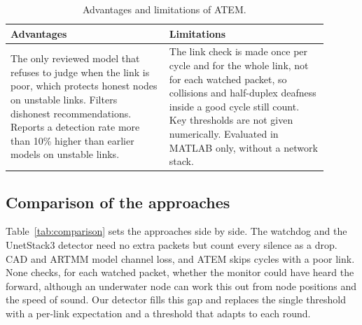 \documentclass{article}
\begin{document}
\begin{table}[htbp]
\centering\footnotesize\renewcommand{\arraystretch}{1.1}
\begin{tabular}{|p{0.45\linewidth}|p{0.45\linewidth}|}
\hline
\textbf{Advantages} & \textbf{Limitations} \\
\hline
The only reviewed model that refuses to judge when the link is poor, which protects honest nodes on unstable links. Filters dishonest recommendations. Reports a detection rate more than 10\% higher than earlier models on unstable links. & The link check is made once per cycle and for the whole link, not for each watched packet, so collisions and half-duplex deafness inside a good cycle still count. Key thresholds are not given numerically. Evaluated in MATLAB only, without a network stack. \\
\hline
\end{tabular}
\caption{Advantages and limitations of ATEM.}
\end{table}

\subsection{Comparison of the approaches}\label{sec:comparison}
\noindent
Table~\ref{tab:comparison} sets the approaches side by side. The watchdog and the UnetStack3 detector need no extra packets but count every silence as a drop. CAD and ARTMM model channel loss, and ATEM skips cycles with a poor link. None checks, for each watched packet, whether the monitor could have heard the forward, although an underwater node can work this out from node positions and the speed of sound. Our detector fills this gap and replaces the single threshold with a per-link expectation and a threshold that adapts to each round.
\end{document}

